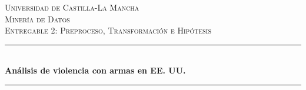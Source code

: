 \documentclass[11pt,a4paper]{article}
\begin{document}


\begin{titlepage} %
	\newcommand{\HRule}{\rule{\linewidth}{0.5mm}} %
	
	\center %
	
	
	\textsc{\LARGE Universidad de Castilla-La Mancha}\\[1.5cm] %
	
	\textsc{\Large Minería de Datos}\\[0.5cm] %
	
	\textsc{\large Entregable 2: Preproceso, Transformación e Hipótesis}\\[0.5cm] %
	
	
	\HRule\\[0.4cm]
	
	{\huge\bfseries Análisis de violencia con armas en EE. UU.}\\[0.4cm] %
	
	\HRule\\[1.5cm]
	
	

\end{titlepage}
\end{document}
